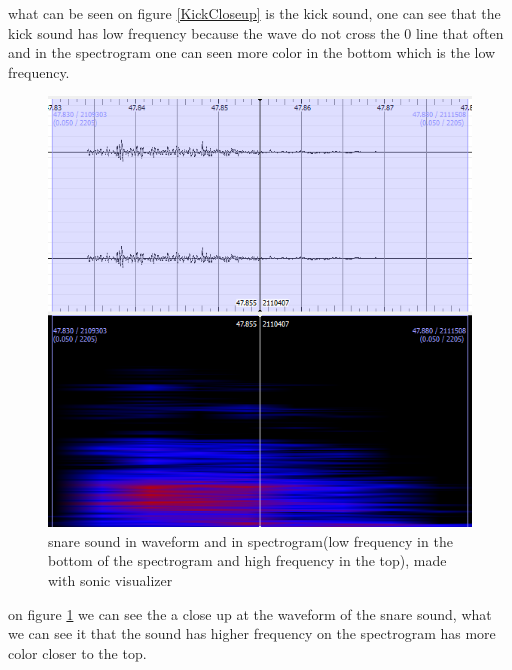 what can be seen on figure \ref{KickCloseup} is the kick sound, one can see that the kick sound has low frequency because the wave do not cross the 0 line that often and in the spectrogram one can seen more color in the bottom which is the low frequency.\\ 
\begin{figure}[h]
	\begin{center}
		\includegraphics[scale = 0.4]{fig/Snare-close-up-with-spectrogram.png}
		\caption{snare sound in waveform and in spectrogram(low frequency in the bottom of the spectrogram and high frequency in the top), made with sonic visualizer}
		\label{snareCloseup}
	\end{center}
\end{figure}
on figure \ref{snareCloseup} we can see the a close up at the waveform of the snare sound, what we can see it that the sound has higher frequency on the spectrogram has more color closer to the top. 
\\
